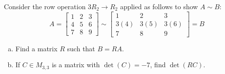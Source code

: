 \begin{applicationActivities}
\begin{activity}{5}
Consider the row operation \(3R_2\to R_2\) applied as follows to show
\(A\sim B\):
\[
A=\begin{bmatrix}1&2&3\\4&5&6\\7&8&9\end{bmatrix}
  \sim
\begin{bmatrix}1&2&3\\3(4)&3(5)&3(6)\\7&8&9\end{bmatrix}=B
\]
\begin{enumerate}[(a)]
\item Find a matrix \(R\) such that \(B=RA\).
\item If \(C \in M_{3,3}\) is a matrix with \(\det(C)= -7\), find \(\det(RC)\).
\end{enumerate}
\end{activity}


\end{applicationActivities}
